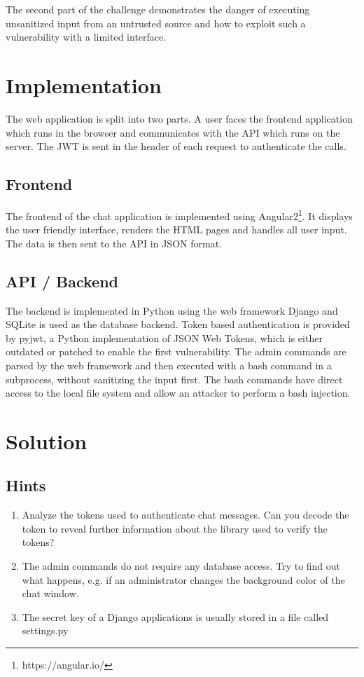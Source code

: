 \documentclass[12pt,a4paper]{article}
\begin{document}
The second part of the challenge demonstrates the danger of executing unsanitized input from an untrusted source and how to exploit such a vulnerability with a limited interface.


\section{Implementation}

The web application is split into two parts. A user faces the frontend application which runs in the browser and communicates with the API which runs on the server. The JWT is sent in the header of each request to authenticate the calls.

\subsection{Frontend}
The frontend of the chat application is implemented using Angular2\footnote{https://angular.io/}. It displays the user friendly interface, renders the HTML pages and handles all user input. The data is then sent to the API in JSON format. 
 
\subsection{API / Backend}
The backend is implemented in Python using the web framework Django and SQLite is used as the database backend. Token based authentication is provided by pyjwt, a Python implementation of JSON Web Tokens, which is either outdated or patched to enable the first vulnerability. The admin commands are parsed by the web framework and then executed with a bash command in a subprocess, without sanitizing the input first. The bash commands have direct access to the local file system and allow an attacker to perform a bash injection.

\section{Solution}

\subsection{Hints}
\begin{enumerate}
	\item Analyze the tokens used to authenticate chat messages. Can you decode the token to reveal further information about the library used to verify the tokens?
	\item The admin commands do not require any database access. Try to find out what happens, e.g. if an administrator changes the background color of the chat window.
	\item The secret key of a Django applications is usually stored in a file called settings.py
\end{enumerate}
\end{document}
